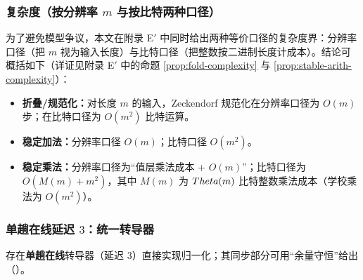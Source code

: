 \subsubsection{复杂度（按分辨率 \texorpdfstring{$m$}{m} 与按比特两种口径）}

为了避免模型争议，本文在附录 E$'$ 中同时给出两种等价口径的复杂度界：分辨率口径（把 $m$ 视为输入长度）与比特口径（把整数按二进制长度计成本）。结论可概括如下（详证见附录 E$'$ 中的命题 \ref{prop:fold-complexity} 与 \ref{prop:stable-arith-complexity}）：

\begin{itemize}
  \item \textbf{折叠/规范化：}对长度 $m$ 的输入，Zeckendorf 规范化在分辨率口径为 $O(m)$ 步；在比特口径为 $O(m^2)$ 比特运算。
  \item \textbf{稳定加法：}分辨率口径 $O(m)$；比特口径 $O(m^2)$。
  \item \textbf{稳定乘法：}分辨率口径为“值层乘法成本 + $O(m)$”；比特口径为 $O(M(m)+m^2)$，其中 $M(m)$ 为 $\\Theta(m)$ 比特整数乘法成本（学校乘法为 $O(m^2)$）。
\end{itemize}

\subsubsection{单趟在线延迟 \texorpdfstring{$3$}{3}：统一转导器}\label{subsec:online-delay}
存在\textbf{单趟在线}转导器（延迟 3）直接实现归一化；其同步部分可用“余量守恒”给出（\cite{Frougny1999OnlineAddition}）。

